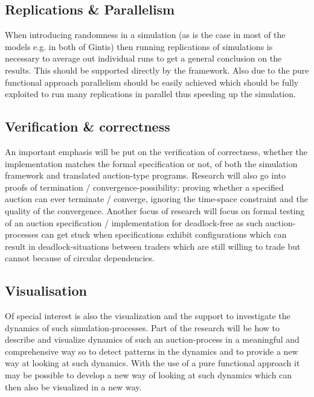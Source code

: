 \documentclass{article}
\begin{document}
\subsection{Replications \& Parallelism}
When introducing randomness in a simulation (as is the case in most of the models e.g. in both of Gintis) then running replications of simulations is necessary to average out individual runs to get a general conclusion on the results. This should be supported directly by the framework. Also due to the pure functional approach parallelism should be easily achieved which should be fully exploited to run many replications in parallel thus speeding up the simulation.

\subsection{Verification \& correctness}
An important emphasis will be put on the verification of correctness, whether the implementation matches the formal specification or not, of both the simulation framework and translated auction-type programs. Research will also go into proofs of termination / convergence-possibility: proving whether a specified auction can ever terminate / converge, ignoring the time-space constraint and the quality of the convergence. Another focus of research will focus on formal testing of an auction specification / implementation for deadlock-free as such auction-processes can get stuck when specifications exhibit configurations which can result in deadlock-situations between traders which are still willing to trade but cannot because of circular dependencies.

\subsection{Visualisation}
Of special interest is also the visualization and the support to investigate the dynamics of such simulation-processes. Part of the research will be how to describe and visualize dynamics of such an auction-process in a meaningful and comprehensive way so to detect patterns in the dynamics and to provide a new way at looking at such dynamics. With the use of a pure functional approach it may be possible to develop a new way of looking at such dynamics which can then also be visualized in a new way.

\end{document}
